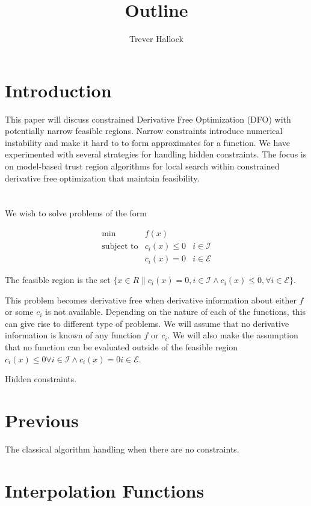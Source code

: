 \documentclass{article}
\author{Trever Hallock}
\title{Outline}
\begin{document}
\section{Introduction}

This paper will discuss constrained Derivative Free Optimization (DFO) with potentially narrow feasible regions.
Narrow constraints introduce numerical instability and make it hard to to form approximates for a function.
We have experimented with several strategies for handling hidden constraints.
The focus is on model-based trust region algorithms for local search within constrained derivative free optimization that maintain feasibility.



\section{}
We wish to solve problems of the form

\[ \begin{array}{ccl} \min & f(x) \\
\mbox{subject to} & c_i(x) \le 0 & i \in \mathcal{I} \\
& c_i(x) = 0 & i \in \mathcal{E}
\end{array}
\]

The feasible region is the set $\{x \in R \| c_i(x) = 0, i \in \mathcal{I} \wedge c_i(x) \le 0, \forall i \in \mathcal{E} \}$.


This problem becomes derivative free when derivative information about either $f$ or some $c_i$ is not available.
Depending on the nature of each of the functions, this can give rise to different type of problems.
We will assume that no derivative information is known of any function $f$ or $c_i$.
We will also make the assumption that no function can be evaluated outside of the feasible region $c_i(x) \le 0 \forall i \in \mathcal{I} \wedge c_i(x) = 0 i \in \mathcal{E}$.

Hidden constraints.


\section{Previous}
The classical algorithm handling when there are no constraints.


\section{Interpolation Functions}
\end{document}
